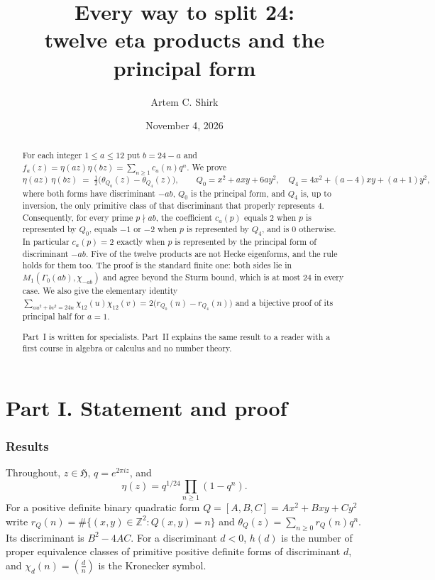 \documentclass[11pt]{amsart}
\title[Every way to split 24]{Every way to split 24:\\ twelve eta products and the principal form}
\author{Artem C. Shirk}
\date{November 4, 2026}
\theoremstyle{definition}
\theoremstyle{remark}
\newcommand{\Z}{\mathbb{Z}}
\newcommand{\h}{\mathfrak{H}}
\newcommand{\leg}[2]{\left(\frac{#1}{#2}\right)}
\newcommand{\form}[3]{[#1,#2,#3]}
\begin{document}
\begin{abstract}
For each integer $1\le a\le 12$ put $b=24-a$ and $f_a(z)=\eta(az)\eta(bz)=\sum_{n\ge1}c_a(n)q^n$. We prove
\[
\eta(az)\,\eta(bz)\;=\;\tfrac12\bigl(\theta_{Q_0}(z)-\theta_{Q_4}(z)\bigr),\qquad
Q_0=x^2+axy+6ay^2,\quad Q_4=4x^2+(a-4)xy+(a+1)y^2,
\]
where both forms have discriminant $-ab$, $Q_0$ is the principal form, and $Q_4$ is, up to inversion, the only primitive class of that discriminant that properly represents $4$. Consequently, for every prime $p\nmid ab$, the coefficient $c_a(p)$ equals $2$ when $p$ is represented by $Q_0$, equals $-1$ or $-2$ when $p$ is represented by $Q_4$, and is $0$ otherwise. In particular $c_a(p)=2$ exactly when $p$ is represented by the principal form of discriminant $-ab$. Five of the twelve products are not Hecke eigenforms, and the rule holds for them too. The proof is the standard finite one: both sides lie in $M_1(\Gamma_0(ab),\chi_{-ab})$ and agree beyond the Sturm bound, which is at most $24$ in every case. We also give the elementary identity $\sum_{au^2+bv^2=24n}\chi_{12}(u)\chi_{12}(v)=2\bigl(r_{Q_0}(n)-r_{Q_4}(n)\bigr)$ and a bijective proof of its principal half for $a=1$.

Part~I is written for specialists. Part~II explains the same result to a reader with a first course in algebra or calculus and no number theory.
\end{abstract}

\maketitle
\tableofcontents

\part*{Part I. Statement and proof}

\section{Results}\label{sec:results}

Throughout, $z\in\h$, $q=e^{2\pi i z}$, and
\[
\eta(z)=q^{1/24}\prod_{n\ge1}(1-q^n).
\]
For a positive definite binary quadratic form $Q=\form{A}{B}{C}=Ax^2+Bxy+Cy^2$ write $r_Q(n)=\#\{(x,y)\in\Z^2:Q(x,y)=n\}$ and $\theta_Q(z)=\sum_{n\ge0}r_Q(n)q^n$. Its discriminant is $B^2-4AC$. For a discriminant $d<0$, $h(d)$ is the number of proper equivalence classes of primitive positive definite forms of discriminant $d$, and $\chi_d(n)=\leg{d}{n}$ is the Kronecker symbol.
\end{document}
